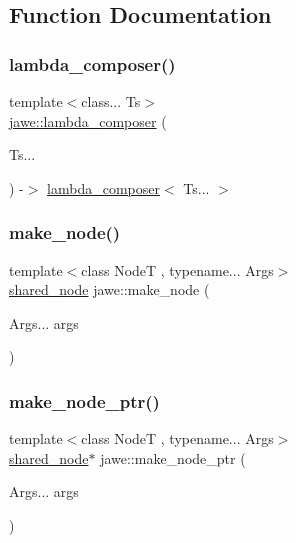 \subsection{Function Documentation}
\mbox{\label{namespacejawe_af06095d386aabfc20a148ceff0d55ab7}} 
\subsubsection{\texorpdfstring{lambda\+\_\+composer()}{lambda\_composer()}}
{\footnotesize\ttfamily template$<$class... Ts$>$ \\
\hyperlink{structjawe_1_1lambda__composer}{jawe\+::lambda\+\_\+composer} (\begin{DoxyParamCaption}\item[{Ts...}]{ }\end{DoxyParamCaption}) -\/$>$  \hyperlink{structjawe_1_1lambda__composer}{lambda\+\_\+composer}$<$ Ts... $>$}

\mbox{\label{namespacejawe_a0a97be2462d600042105436fe23cd584}} 
\subsubsection{\texorpdfstring{make\+\_\+node()}{make\_node()}}
{\footnotesize\ttfamily template$<$class NodeT , typename... Args$>$ \\
\hyperlink{namespacejawe_a3f307481d921b6cbb50cc8511fc2b544}{shared\+\_\+node} jawe\+::make\+\_\+node (\begin{DoxyParamCaption}\item[{Args...}]{args }\end{DoxyParamCaption})}

\mbox{\label{namespacejawe_add28adbc7f76f9876fe5792897346029}} 
\subsubsection{\texorpdfstring{make\+\_\+node\+\_\+ptr()}{make\_node\_ptr()}}
{\footnotesize\ttfamily template$<$class NodeT , typename... Args$>$ \\
\hyperlink{namespacejawe_a3f307481d921b6cbb50cc8511fc2b544}{shared\+\_\+node}$\ast$ jawe\+::make\+\_\+node\+\_\+ptr (\begin{DoxyParamCaption}\item[{Args...}]{args }\end{DoxyParamCaption})}



